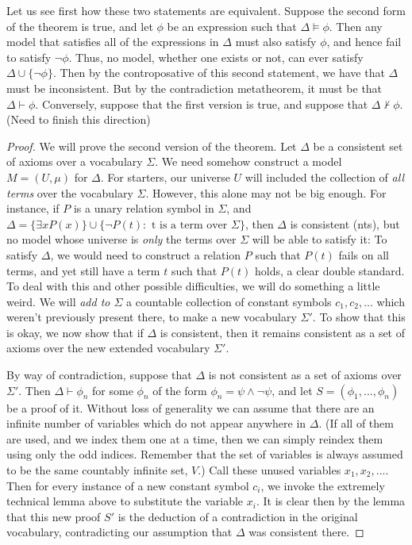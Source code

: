 \documentclass{article}
\theoremstyle{definition}
\theoremstyle{plain}
\theoremstyle{theorem}
\begin{document}
Let us see first how these two statements are equivalent. Suppose the second form of the theorem is true, and let $\phi$ be an expression such that $\Delta \models \phi$. Then any model that satisfies all of the expressions in $\Delta$ must also satisfy $\phi$, and hence fail to satisfy $\neg \phi$. Thus, no model, whether one exists or not, can ever satisfy $\Delta \cup \{\neg \phi\}$. Then by the controposative of this second statement, we have that $\Delta$ must be inconsistent. But by the contradiction metatheorem, it must be that $\Delta \vdash \phi$. Conversely, suppose that the first version is true, and suppose that $\Delta \nvdash \phi$. (Need to finish this direction)
\begin{proof}
    We will prove the second version of the theorem. Let $\Delta$ be a consistent set of axioms over a vocabulary $\Sigma$. We need somehow construct a model $M = (U,\mu)$ for $\Delta$. For starters, our universe $U$ will included the collection of \textit{all terms} over the vocabulary $\Sigma$. However, this alone may not be big enough. For instance, if $P$ is a unary relation symbol in $\Sigma$, and $\Delta = \{\exists x P(x)\} \cup \{\neg P(t): \textrm{ t is a term over $\Sigma$}\}$, then $\Delta$ is consistent (nts), but no model whose universe is \textit{only} the terms over $\Sigma$ will be able to satisfy it: To satisfy $\Delta$, we would need to construct a relation $P$ such that $P(t)$ fails on all terms, and yet still have a term $t$ such that $P(t)$ holds, a clear double standard. To deal with this and other possible difficulties, we will do something a little weird. We will \textit{add to $\Sigma$} a countable collection of constant symbols $c_1,c_2,...$ which weren't previously present there, to make a new vocabulary $\Sigma'$. To show that this is okay, we now show that if $\Delta$ is consistent, then it remains consistent as a set of axioms over the new extended vocabulary $\Sigma'$.
    \par By way of contradiction, suppose that $\Delta$ is not consistent as a set of axioms over $\Sigma'$. Then $\Delta \vdash \phi_n$ for some $\phi_n$ of the form $\phi_n = \psi \wedge \neg \psi$, and let $S = (\phi_1,...,\phi_n)$ be a proof of it. Without loss of generality we can assume that there are an infinite number of variables which do not appear anywhere in $\Delta$. (If all of them are used, and we index them one at a time, then we can simply reindex them using only the odd indices. Remember that the set of variables is always assumed to be the same countably infinite set, $V$.) Call these unused variables $x_1,x_2,...$. Then for every instance of a new constant symbol $c_i$, we invoke the extremely technical lemma above to substitute the variable $x_i$. It is clear then by the lemma that this new proof $S'$ is the deduction of a contradiction in the original vocabulary, contradicting our assumption that $\Delta$ was consistent there.

\end{proof}
\end{document}
